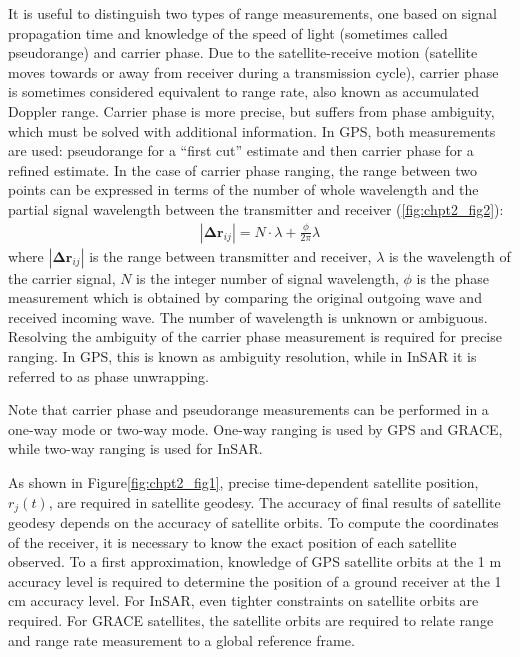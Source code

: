 It is useful to distinguish two types of range measurements, one based on signal propagation time and knowledge of the speed of light (sometimes called pseudorange) and carrier phase.  Due to the satellite-receive motion (satellite moves towards or away from receiver during a transmission cycle), carrier phase is sometimes considered equivalent to range rate, also known as accumulated Doppler range.  
Carrier phase is more precise, but suffers from phase ambiguity, which must be solved with additional information.  In GPS, both measurements are used: pseudorange for a “first cut” estimate and then carrier phase for a refined estimate.  In the case of carrier phase ranging, the range between two points can be expressed in terms of the number of whole wavelength and the partial signal wavelength between the transmitter and receiver (\ref{fig:chpt2_fig2}):
\begin{equation} \label{eq:chpt2_eq2}
\begin{aligned}
|\boldsymbol{\Delta r}_{ij}|=N \cdot \lambda +  \frac{\phi}{2\pi} \lambda
\end{aligned}
\end{equation}
where $|\boldsymbol{\Delta r}_{ij}|$ is the range between transmitter and receiver, $\lambda$ is the wavelength of the carrier signal, $N$ is the integer number of signal wavelength, $\phi$ is the phase measurement which is obtained by comparing the original outgoing wave and received incoming wave.  The number of wavelength is unknown or ambiguous.  Resolving the ambiguity of the carrier phase measurement is required for precise ranging.  In GPS, this is known as ambiguity resolution, while in InSAR it is referred to as phase unwrapping.   

Note that carrier phase and pseudorange measurements can be performed in a one-way mode or two-way mode.  One-way ranging is used by GPS and GRACE, while two-way ranging is used for InSAR.   

As shown in Figure\ref{fig:chpt2_fig1}, precise time-dependent satellite position, $r_{j}(t)$, are required in satellite geodesy.  The accuracy of final results of satellite geodesy depends on the accuracy of satellite orbits.  To compute the coordinates of the receiver, it is necessary to know the exact position of each satellite observed.  To a first approximation, knowledge of GPS satellite orbits at the 1 m accuracy level is required to determine the position of a ground receiver at the 1 cm accuracy level.  For InSAR, even tighter constraints on satellite orbits are required.  For GRACE satellites, the satellite orbits are required to relate range and range rate measurement to a global reference frame. 

